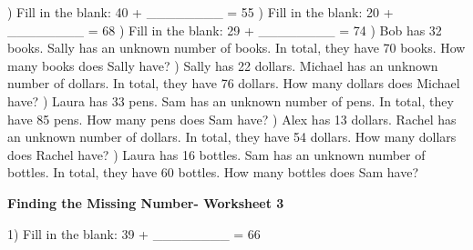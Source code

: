 \documentclass{article}%
\begin{document}
\newline%
\newline%
) Fill in the blank: 40 + \_\_\_\_\_\_\_\_ = 55%
\newline%
\newline%
) Fill in the blank: 20 + \_\_\_\_\_\_\_\_ = 68%
\newline%
\newline%
) Fill in the blank: 29 + \_\_\_\_\_\_\_\_ = 74%
\newline%
\newline%
) Bob has 32 books. Sally has an unknown number of books. In total, they have 70 books. How many books does Sally have?%
\newline%
\newline%
) Sally has 22 dollars. Michael has an unknown number of dollars. In total, they have 76 dollars. How many dollars does Michael have?%
\newline%
\newline%
) Laura has 33 pens. Sam has an unknown number of pens. In total, they have 85 pens. How many pens does Sam have?%
\newline%
\newline%
) Alex has 13 dollars. Rachel has an unknown number of dollars. In total, they have 54 dollars. How many dollars does Rachel have?%
\newline%
\newline%
) Laura has 16 bottles. Sam has an unknown number of bottles. In total, they have 60 bottles. How many bottles does Sam have?%
\newline%
\newline%
\newline%
\pagebreak%
\large%
\begin{center}%
\textbf{Finding the Missing Number- Worksheet 3}%
\newline%
\newline%
\newline%
\end{center} \normalsize%
1) Fill in the blank: 39 + \_\_\_\_\_\_\_\_ = 66%
\newline%
\newline%
\end{document}
